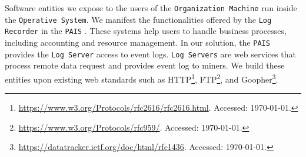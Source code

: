 Software entities we expose to the users of the \texttt{Organization Machine} run inside the \texttt{Operative System}. We manifest the functionalities offered by the \texttt{Log Recorder} in the \texttt{PAIS}  \cite{Dumas.etal/2018:FundamentalsofBPM}. These systems help users to handle business processes, including accounting and resource management. In our solution, the \texttt{PAIS} provides the \texttt{Log Server} access to event logs. \texttt{Log Servers} are web services that process remote data request and provides event log to miners. We build these entities upon existing web standards such as HTTP\footnote{\url{https://www.w3.org/Protocols/rfc2616/rfc2616.html}. Accessed: \today.}, FTP\footnote{\url{https://www.w3.org/Protocols/rfc959/}. Accessed: \today.}, and Goopher\footnote{\url{https://datatracker.ietf.org/doc/html/rfc1436}. Accessed: \today.}.

